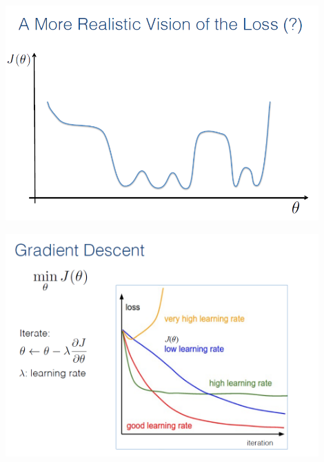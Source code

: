 \documentclass{beamer}
\begin{document}
\begin{frame}
\includegraphics[width=0.9\textwidth]{images/optim_4.PNG} \\
\end{frame}
\begin{frame}
\includegraphics[width=0.9\textwidth]{images/optim_5.PNG} \\
\end{frame}
\end{document}
